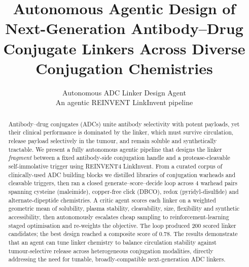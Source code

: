 \documentclass[10pt]{article}
\title{\textbf{Autonomous Agentic Design of Next-Generation Antibody--Drug Conjugate Linkers Across Diverse Conjugation Chemistries}}
\author{Autonomous ADC Linker Design Agent\\\small An agentic REINVENT LinkInvent pipeline}
\date{}
\begin{document}
\maketitle
\begin{abstract}
Antibody--drug conjugates (ADCs) unite antibody selectivity with potent payloads, yet their clinical performance is dominated by the linker, which must survive circulation, release payload selectively in the tumour, and remain soluble and synthetically tractable. We present a fully autonomous agentic pipeline that designs the linker \emph{fragment} between a fixed antibody-side conjugation handle and a protease-cleavable self-immolative trigger using REINVENT4 LinkInvent. From a curated corpus of clinically-used ADC building blocks we distilled libraries of conjugation warheads and cleavable triggers, then ran a closed generate--score--decide loop across 4 warhead pairs spanning cysteine (maleimide), copper-free click (DBCO), redox (pyridyl-disulfide) and alternate-dipeptide chemistries. A critic agent scores each linker on a weighted geometric mean of solubility, plasma stability, cleavability, size, flexibility and synthetic accessibility, then autonomously escalates cheap sampling to reinforcement-learning staged optimisation and re-weights the objective. The loop produced 200 scored linker candidates; the best design reached a composite score of 0.78. The results demonstrate that an agent can tune linker chemistry to balance circulation stability against tumour-selective release across heterogeneous conjugation modalities, directly addressing the need for tunable, broadly-compatible next-generation ADC linkers.
\end{abstract}
\end{document}
